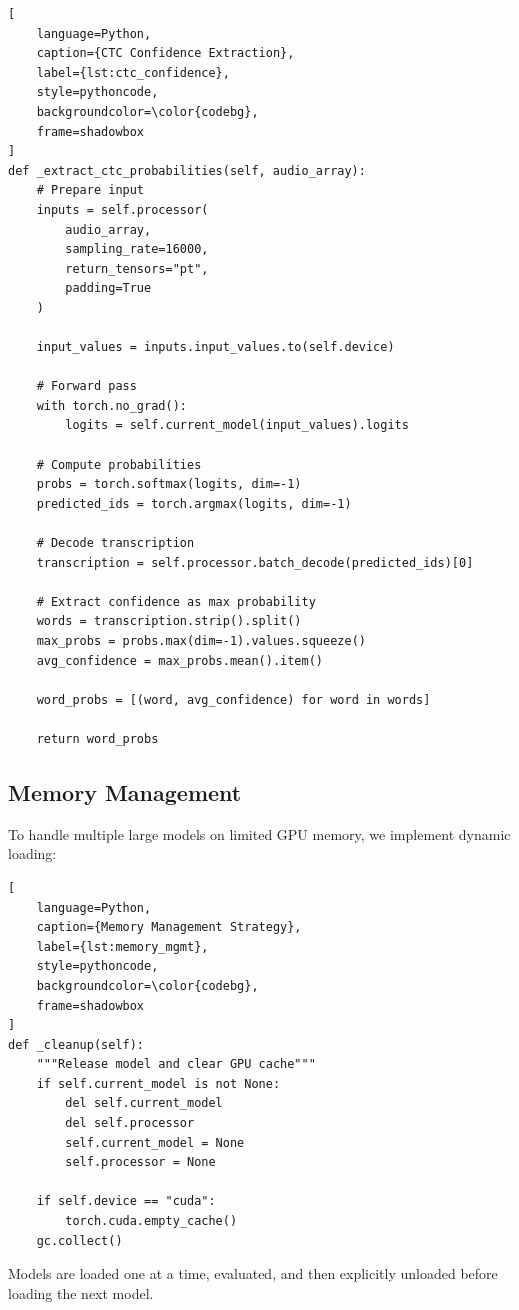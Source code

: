 \begin{lstlisting}[
    language=Python,
    caption={CTC Confidence Extraction},
    label={lst:ctc_confidence},
    style=pythoncode,
    backgroundcolor=\color{codebg},
    frame=shadowbox
]
def _extract_ctc_probabilities(self, audio_array):
    # Prepare input
    inputs = self.processor(
        audio_array,
        sampling_rate=16000,
        return_tensors="pt",
        padding=True
    )
    
    input_values = inputs.input_values.to(self.device)
    
    # Forward pass
    with torch.no_grad():
        logits = self.current_model(input_values).logits
    
    # Compute probabilities
    probs = torch.softmax(logits, dim=-1)
    predicted_ids = torch.argmax(logits, dim=-1)
    
    # Decode transcription
    transcription = self.processor.batch_decode(predicted_ids)[0]
    
    # Extract confidence as max probability
    words = transcription.strip().split()
    max_probs = probs.max(dim=-1).values.squeeze()
    avg_confidence = max_probs.mean().item()
    
    word_probs = [(word, avg_confidence) for word in words]
    
    return word_probs
\end{lstlisting}

\subsection{Memory Management}

To handle multiple large models on limited GPU memory, we implement dynamic loading:

\begin{lstlisting}[
    language=Python,
    caption={Memory Management Strategy},
    label={lst:memory_mgmt},
    style=pythoncode,
    backgroundcolor=\color{codebg},
    frame=shadowbox
]
def _cleanup(self):
    """Release model and clear GPU cache"""
    if self.current_model is not None:
        del self.current_model
        del self.processor
        self.current_model = None
        self.processor = None
    
    if self.device == "cuda":
        torch.cuda.empty_cache()
    gc.collect()
\end{lstlisting}

Models are loaded one at a time, evaluated, and then explicitly unloaded before loading the next model.

